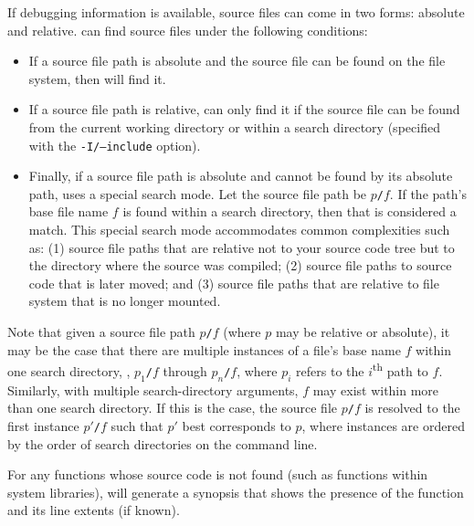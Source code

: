 \documentclass[11pt,twoside,letterpaper]{report}
\begin{document}
If debugging information is available, source files can come in two forms: absolute and relative.
\hpcprofAll{} can find source files under the following conditions:
\begin{itemize}
\item If a source file path is absolute and the source file can be found on the file system, then \hpcprofAll{} will find it.
\item If a source file path is relative, \hpcprofAll{} can only find it if the source file can be found from the current working directory or within a search directory (specified with the \texttt{-I/--include} option).
\item Finally, if a source file path is absolute and cannot be found by its absolute path, \hpcprofAll{} uses a special search mode.
Let the source file path be \texttt{$p$/$f$}.
If the path's base file name $f$ is found within a search directory, then that is considered a match.
This special search mode accommodates common complexities such as:
(1) source file paths that are relative not to your source code tree but to the directory where the source was compiled;
(2) source file paths to source code that is later moved; and
(3) source file paths that are relative to file system that is no longer mounted.
\end{itemize}
Note that given a source file path \texttt{$p$/$f$} (where $p$ may be relative or absolute), it may be the case that there are multiple instances of a file's base name $f$ within one search directory, \eg{}, \texttt{$p_1$/$f$} through \texttt{$p_n$/$f$}, where $p_i$ refers to the $i$\textsuperscript{th} path to $f$.
Similarly, with multiple search-directory arguments, $f$ may exist within more than one search directory.
If this is the case, the source file \texttt{$p$/$f$} is resolved to the first instance \texttt{$p'$/$f$} such that $p'$ best corresponds to $p$, where instances are ordered by the order of search directories on the command line.

For any functions whose source code is not found (such as functions within system libraries), \hpcviewer{} will generate a synopsis that shows the presence of the function and its line extents (if known).





\end{document}
